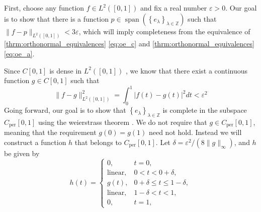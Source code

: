 \documentclass[../thesis.tex]{subfiles}
\begin{document}
First, choose any function $f\in L^2([0,1])$ and fix a real number $\varepsilon >0$. Our goal is to show that there is a function $p \in \operatorname{span} \left( \left\{ e_{\lambda} \right\}_{\lambda\in \mathbb{Z}} \right)$ such that $\|f-p\|_{L^2([0,1])} < 3 \varepsilon$, which will imply completeness from the equivalence of \cref{thrm:orthonormal_equivalences} \cref{eq:oe_c} and \cref{thrm:orthonormal_equivalences} \cref{eq:oe_a}.

Since $C[0,1]$ is dense in $L^2([0,1])$ \cite{heilMetricsNormsInner2018}, we know that there exist a continuous function $g \in C[0,1]$ such that %
\begin{equation}
    \| f-g \|_{L^2([0,1])}^2 = \int_0^1 \left|f(t)-g(t) \right|^2dt < \varepsilon^2
\end{equation}
Going forward, our goal is to show that $\left\{ e_{\lambda} \right\}_{\lambda\in \mathbb{Z}}$ is complete in the subspace $C_{\text{per}}[0,1]$ using the weierstrass theorem \cite{durenInvitationClassicalAnalysis2012}. We do not require that $g \in C_{\text{per}}[0,1]$, meaning that the requirement $g(0)=g(1)$ need not hold. Instead we will construct a function $h$ that belongs to $C_{\text{per}}[0,1]$. Let  $\delta = \varepsilon^2/(8\|g\|_\infty)$, and $h$  be given by %
\begin{equation*}
    h(t) = 
    \begin{cases} 0, &  t=0,\\  
        \text{linear}, &  0<t<0+\delta,\\ 
        g(t), & 0+\delta \leq t \leq 1-\delta,\\ 
        \text{linear}, &  1-\delta <t<1,\\ 
        0, &  t=1,
    \end{cases}
\end{equation*}
\end{document}
